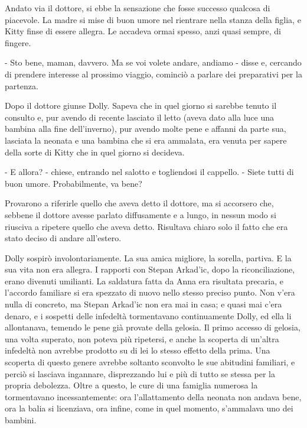 Andato via il dottore, si ebbe la sensazione che fosse successo qualcosa di piacevole. La madre si mise di buon umore nel rientrare nella stanza della figlia, e Kitty finse di essere allegra. Le accadeva ormai spesso, anzi quasi sempre, di fingere. 

- Sto bene, maman, davvero. Ma se voi volete andare, andiamo - disse e, cercando di prendere interesse al prossimo viaggio, cominciò a parlare dei preparativi per la partenza. 

\label{ii-1} 

Dopo il dottore giunse Dolly. Sapeva che in quel giorno si sarebbe tenuto il consulto e, pur avendo di recente lasciato il letto (aveva dato alla luce una bambina alla fine dell'inverno), pur avendo molte pene e affanni da parte sua, lasciata la neonata e una bambina che si era ammalata, era venuta per sapere della sorte di Kitty che in quel giorno si decideva. 

- E allora? - chiese, entrando nel salotto e togliendosi il cappello. - Siete tutti di buon umore. Probabilmente, va bene? 

Provarono a riferirle quello che aveva detto il dottore, ma si accorsero che, sebbene il dottore avesse parlato diffusamente e a lungo, in nessun modo si riusciva a ripetere quello che aveva detto. Risultava chiaro solo il fatto che era stato deciso di andare all'estero. 

Dolly sospirò involontariamente. La sua amica migliore, la sorella, partiva. E la sua vita non era allegra. I rapporti con Stepan Arkad'ic, dopo la riconciliazione, erano divenuti umilianti. La saldatura fatta da Anna era risultata precaria, e l'accordo familiare si era spezzato di nuovo nello stesso preciso punto. Non v'era nulla di concreto, ma Stepan Arkad'ic non era mai in casa; e quasi mai c'era denaro, e i sospetti delle infedeltà tormentavano continuamente Dolly, ed ella li allontanava, temendo le pene già provate della gelosia. Il primo accesso di gelosia, una volta superato, non poteva più ripetersi, e anche la scoperta di un'altra infedeltà non avrebbe prodotto su di lei lo stesso effetto della prima. Una scoperta di questo genere avrebbe soltanto sconvolto le sue abitudini familiari, e perciò si lasciava ingannare, disprezzando lui e più di tutto se stessa per la propria debolezza. Oltre a questo, le cure di una famiglia numerosa la tormentavano incessantemente: ora l'allattamento della neonata non andava bene, ora la balia si licenziava, ora infine, come in quel momento, s'ammalava uno dei bambini. 

